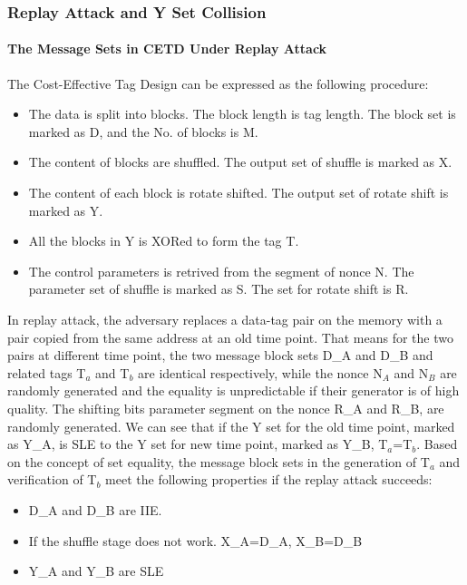 \documentclass{article}
\begin{document}
\subsubsection{Replay Attack and Y Set Collision}
\paragraph{The Message Sets in CETD Under Replay Attack}
The Cost-Effective Tag Design can be expressed as the following procedure:
\begin{itemize}
	\item The data is split into blocks. The block length is tag length. The block set is marked as D, and the No. of blocks is M.
	\item The content of blocks are shuffled. The output set of shuffle is marked as X.
	\item The content of each block is rotate shifted. The output set of rotate shift is marked as Y.
	\item All the blocks in Y is XORed to form the tag T.
	\item The control parameters is retrived from the segment of nonce N. The parameter set of shuffle is marked as S. The set for rotate shift is R.
\end{itemize}

In replay attack, the adversary replaces a data-tag pair on the memory with a
pair copied from the same address at an old time point. That means for the two
pairs at different time point, the two message block sets D\_A and D\_B and related tags T$_a$ and T$_b$ are
identical respectively, while the nonce N$_A$ and N$_B$ are randomly generated and
the equality is unpredictable if their generator is of high quality. The shifting bits parameter segment on the nonce R\_A and R\_B, are randomly
generated.
We can see that if the Y set for the old time point, marked as Y\_A, is SLE to the Y set for new time point, marked as Y\_B, T$_a$=T$_b$.
Based on the concept of set equality, the message block sets in the generation of T$_a$ and verification of T$_b$ meet the following properties if the replay attack succeeds:
\begin{itemize}
	\item D\_A and D\_B are IIE.
	\item If the shuffle stage does not work. X\_A=D\_A, X\_B=D\_B
	\item Y\_A and Y\_B are SLE
\end{itemize}
\end{document}
